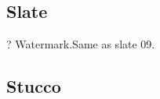 \documentclass[12pt,a4paper]{article}
\begin{document}
\begin{singlespace}
\subsection{\mat}

\renewcommand{\Number}{01}\InputImage{\sfl}{\tsm}{\sfl}{\tsm}{\sexdi}{\tbu}
{}{}
\renewcommand{\Number}{02}\InputImage{\sfl}{\tsm}{\sfl}{\tsm}{\sexdi}{\tbu}
{}{}
\renewcommand{\Number}{03}\InputImage{\sfl}{\tsm}{\sfl}{\tsm}{\sexdi}{\tbu}
{}{}
\renewcommand{\Number}{04}\InputImage{\sexor}{\tsm}{\sfl}{\tsm}{\sexdi}{\tbu}
{}{}
\renewcommand{\Number}{05}\InputImage{\sfl}{\tsm}{\sfl}{\tsm}{\sexdi}{\tbu}
{}{}
\renewcommand{\Number}{06}\InputImage{\sfl}{\tsm}{\sfl}{\tsm}{\sexdi}{\tbu}
{}{}
\renewcommand{\Number}{07}\InputImage{\sfl}{\tsm}{\sfl}{\tsm}{\sexdi}{\tbu}
{}{}
\renewcommand{\Number}{08}\InputImage{\sfl}{\tsm}{\sfl}{\tsm}{\sexdi}{\tbu}
{}{}
\renewcommand{\Number}{09}\InputImage{\sfl}{\tsm}{\sfl}{\tsm}{\sexdi}{\tbu}
{}{}
\renewcommand{\Number}{10}\InputImage{\sexor}{\tsm}{\sfl}{\tsm}{\sexdi}{\tbu}
{}{}
\renewcommand{\Number}{11}\InputImage{\sfl}{\tsm}{\sfl}{\tsm}{\sexdi}{\tbu}
{}{}
\renewcommand{\Number}{12}\InputImage{\sfl}{\tsm}{\sfl}{\tsm}{\sexdi}{\tbu}
{}{}

\clearpage
\renewcommand{\mat}{Slate}
\subsection{\mat}

\renewcommand{\Number}{01}\InputImage{\sfl}{\tco}{\sexdi}{\tco}{\sexdi}{\tco}
{}{}
\renewcommand{\Number}{02}\InputImage{\sfl}{\tco}{\sexor}{\tco}{\sexor}{\tco}
{?}{}
\renewcommand{\Number}{03}\InputImage{\sfl}{\tco}{\sexdi}{\tco}{\sexdi}{\tco}
{}{}
\renewcommand{\Number}{04}\InputImage{\sfl}{\tco}{\sfl}{\tco}{\sexdi}{\tco}
{}{}
\renewcommand{\Number}{05}\InputImage{\sfl}{\tco}{\sexdi}{\tco}{\sexdi}{\tco}
{}{}
\renewcommand{\Number}{06}\InputImage{\sfl}{\tco}{\sexdi}{\tco}{\sexdi}{\tco}
{}{}
\renewcommand{\Number}{07}\InputImage{\sfl}{\tco}{\sexdi}{\tco}{\sexdi}{\tbu}
{}{}
\renewcommand{\Number}{08}\InputImage{\sfl}{\tco}{\sfl}{\tco}{\sfl}{\tco}
{}{}
\renewcommand{\Number}{09}\InputImage{\sfl}{\tco}{\sexdi}{\tco}{\sexdi}{\tco}
{}{}
\renewcommand{\Number}{10}\InputImage{\sfl}{\tco}{\sexdi}{\tco}{\sexdi}{\tco}
{}{}
\renewcommand{\Number}{11}\InputImage{\sfl}{\tco}{\sexdi}{\tco}{\sexdi}{\tco}
{Watermark.}{Same as slate 09.}
\renewcommand{\Number}{12}\InputImage{\sfl}{\tco}{\sexdi}{\tco}{\sexdi}{\tco}
{}{}

\clearpage
\renewcommand{\mat}{Stucco}
\subsection{\mat}


\end{singlespace}
\end{document}
